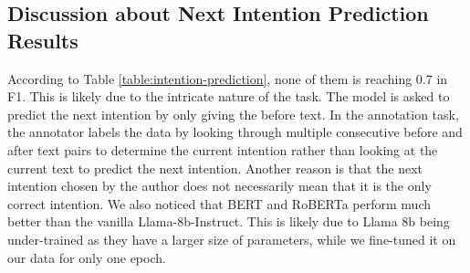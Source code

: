 



\subsection{Discussion about Next Intention Prediction Results}
According to Table \ref{table:intention-prediction}, none of them is reaching 0.7 in F1. This is likely due to the intricate nature of the task. The model is asked to predict the next intention by only giving the before text. In the annotation task, the annotator labels the data by looking through multiple consecutive before and after text pairs to determine the current intention rather than looking at the current text to predict the next intention. Another reason is that the next intention chosen by the author does not necessarily mean that it is the only correct intention.
We also noticed that BERT and RoBERTa perform much better than the vanilla Llama-8b-Instruct. This is likely due to Llama 8b being under-trained as they have a larger size of parameters, while we fine-tuned it on our data for only one epoch.



